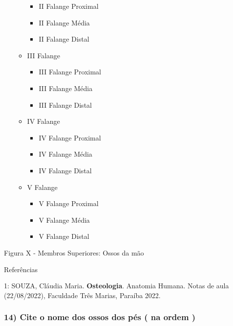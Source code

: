 \documentclass[
]{book}
\providecommand{\tightlist}{%
  \setlength{\itemsep}{0pt}\setlength{\parskip}{0pt}}
\begin{document}
\begin{itemize}
\begin{itemize}
    \begin{itemize}
    \tightlist
    \item
      II Falange Proximal
    \item
      II Falange Média
    \item
      II Falange Distal
    \end{itemize}
  \item
    III Falange

    \begin{itemize}
    \tightlist
    \item
      III Falange Proximal
    \item
      III Falange Média
    \item
      III Falange Distal
    \end{itemize}
  \item
    IV Falange

    \begin{itemize}
    \tightlist
    \item
      IV Falange Proximal
    \item
      IV Falange Média
    \item
      IV Falange Distal
    \end{itemize}
  \item
    V Falange

    \begin{itemize}
    \tightlist
    \item
      V Falange Proximal
    \item
      V Falange Média
    \item
      V Falange Distal
    \end{itemize}
  \end{itemize}
\end{itemize}

Figura X - Membros Superiores: Ossos da mão

Referências

1: SOUZA, Cláudia Maria. \textbf{Osteologia}. Anatomia Humana. Notas de aula (22/08/2022), Faculdade Três Marias, Paraíba 2022.

\hypertarget{cite-o-nome-dos-ossos-dos-puxe9s-na-ordem}{%
\subsubsection*{14) Cite o nome dos ossos dos pés ( na ordem )}\label{cite-o-nome-dos-ossos-dos-puxe9s-na-ordem}}
\end{document}
